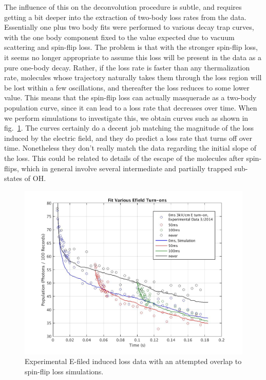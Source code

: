\documentclass[%
 reprint,
 amsmath,amssymb,
 aps,
prl,
]{revtex4-1}
\begin{document}
The influence of this on the deconvolution procedure is subtle, and requires getting a bit deeper into the extraction of two-body loss rates from the data. 
Essentially one plus two body fits were performed to various decay trap curves, with the one body component fixed to the value expected due to vacuum scattering and spin-flip loss.
The problem is that with the stronger spin-flip loss, it seems no longer appropriate to assume this loss will be present in the data as a pure one-body decay.
Rather, if the loss rate is faster than any thermalization rate, molecules whose trajectory naturally takes them through the loss region will be lost within a few oscillations, and thereafter the loss reduces to some lower value.
This means that the spin-flip loss can actually masquerade as a two-body population curve, since it can lead to a loss rate that decreases over time.
When we perform simulations to investigate this, we obtain curves such as shown in fig.~\ref{fig:eil}.
The curves certainly do a decent job matching the magnitude of the loss induced by the electric field, and they do predict a loss rate that turns off over time.
Nonetheless they don't really match the data regarding the initial slope of the loss.
This could be related to details of the escape of the molecules after spin-flips, which in general involve several intermediate and partially trapped sub-states of OH.

\begin{figure}[tb]
\includegraphics[width=\linewidth]{SuppFigs/EIL.png}%
\caption{
Experimental E-filed induced loss data with an attempted overlap to spin-flip loss simulations.
}
\label{fig:eil}
\end{figure}
\end{document}
